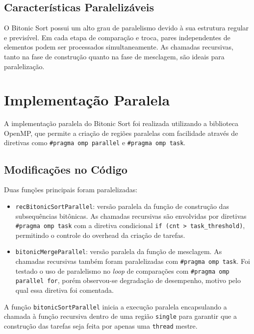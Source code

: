 \documentclass{article}
\begin{document}
\subsection{Características Paralelizáveis}

O Bitonic Sort possui um alto grau de paralelismo devido à sua estrutura regular e previsível. Em cada etapa de comparação e troca, pares independentes de elementos podem ser processados simultaneamente. As chamadas recursivas, tanto na fase de construção quanto na fase de mesclagem, são ideais para paralelização.

\section{Implementação Paralela}

A implementação paralela do Bitonic Sort foi realizada utilizando a biblioteca OpenMP, que permite a criação de regiões paralelas com facilidade através de diretivas como \texttt{\#pragma omp parallel} e \texttt{\#pragma omp task}.

\subsection{Modificações no Código}

Duas funções principais foram paralelizadas:

\begin{itemize}
  \item \texttt{recBitonicSortParallel}: versão paralela da função de construção das subsequências bitônicas. As chamadas recursivas são envolvidas por diretivas \texttt{\#pragma omp task} com a diretiva condicional \texttt{if (cnt > task\_threshold)}, permitindo o controle do overhead da criação de tarefas.
  \item \texttt{bitonicMergeParallel}: versão paralela da função de mesclagem. As chamadas recursivas também foram paralelizadas com \texttt{\#pragma omp task}. Foi testado o uso de paralelismo no \textit{loop} de comparações com \texttt{\#pragma omp parallel for}, porém observou-se degradação de desempenho, motivo pelo qual essa diretiva foi comentada.
\end{itemize}

A função \texttt{bitonicSortParallel} inicia a execução paralela encapsulando a chamada à função recursiva dentro de uma região \texttt{single} para garantir que a construção das tarefas seja feita por apenas uma \texttt{thread} mestre.
\end{document}
